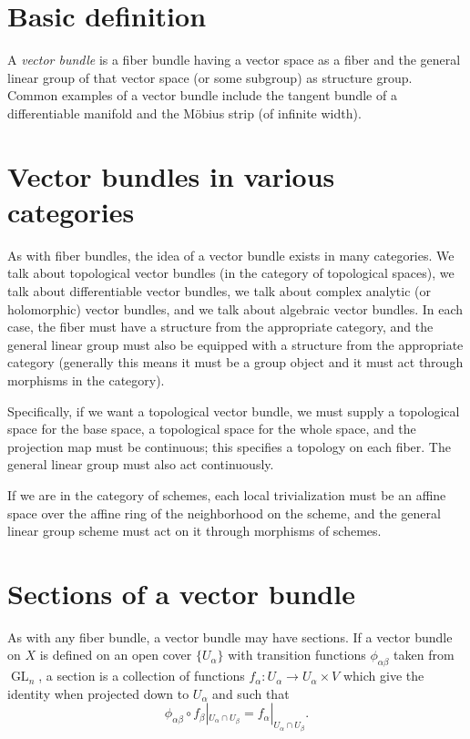 \documentclass[12pt]{article}
\begin{document}
\section*{Basic definition}

A \emph{vector bundle} is a fiber bundle having a vector space as a fiber and the general linear group of that vector space (or some subgroup) as structure group. Common examples of a vector bundle include the tangent bundle of a differentiable manifold and the M\"obius strip (of infinite width). 

\section*{Vector bundles in various categories}

As with fiber bundles, the idea of a vector bundle exists in many categories.  We talk about topological vector bundles (in the category of topological spaces), we talk about differentiable vector bundles, we talk about complex analytic (or holomorphic) vector bundles, and we talk about algebraic vector bundles.  In each case, the fiber must have a structure from the appropriate category, and the general linear group must also be equipped with a structure from the appropriate category (generally this means it must be a group object and it must act through morphisms in the category). 

Specifically, if we want a topological vector bundle, we must supply a topological space for the base space, a topological space for the whole space, and the projection map must be continuous; this specifies a topology on each fiber.  The general linear group must also act continuously.

If we are in the category of schemes, each local trivialization must be an affine space over the affine ring of the neighborhood on the scheme, and the general linear group scheme must act on it through morphisms of schemes. 

\section*{Sections of a vector bundle}

As with any fiber bundle, a vector bundle may have sections.  If a vector bundle on $X$ is defined on an open cover $\{U_\alpha\}$ with transition functions $\phi_{\alpha\beta}$ taken from $\mathop{GL}_n$, a section is a collection of functions $f_\alpha:U_\alpha\to U_\alpha\times V$ which give the identity when projected down to $U_\alpha$ and such that 
\[
\phi_{\alpha\beta}\circ f_\beta|_{U_\alpha \cap U_\beta} = f_\alpha|_{U_\alpha \cap U_\beta}.
\]
\end{document}

